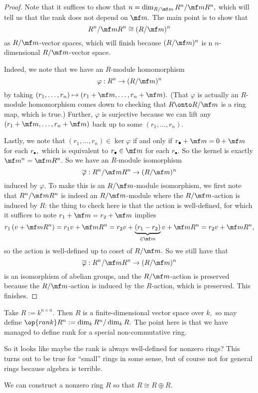 \documentclass[../notes.tex]{subfiles}
\begin{document}
\begin{proof}
	Note that it suffices to show that $n=\dim_{R/\mf m}R^n/\mf mR^n,$ which will tell us that the rank does not depend on $\mf m.$ The main point is to show that
	\[R^n/\mf mR^n\cong(R/\mf m)^n\]
	as $R/\mf m$-vector spaces, which will finish because $(R/\mf m)^n$ is n $n$-dimensional $R/\mf m$-vector space.

	Indeed, we note that we have an $R$-module homomorphism
	\[\varphi:R^n\to(R/\mf m)^n\]
	by taking $(r_1,\ldots,r_n)\mapsto(r_1+\mf m,\ldots,r_n+\mf m).$ (That $\varphi$ is actually an $R$-module homomorphism comes down to checking that $R\onto R/\mf m$ is a ring map, which is true.) Further, $\varphi$ is surjective because we can lift any $(r_1+\mf m,\ldots,r_n+\mf m)$ back up to some $(r_1,\ldots,r_n).$

	Lastly, we note that $(r_1,\ldots,r_n)\in\ker\varphi$ if and only if $r_\bullet+\mf m=0+\mf m$ for each $r_\bullet,$ which is equivalent to $r_\bullet\in\mf m$ for each $r_\bullet.$ So the kernel is exactly $\mf m^n=\mf mR^n.$ So we have an $R$-module isomorphism
	\[\overline\varphi:R^n/\mf mR^n\to(R/\mf m)^n\]
	induced by $\varphi.$ To make this is an $R/\mf m$-module isomorphism, we first note that $R^n/\mf mR^n$ is indeed an $R/\mf m$-module where the $R/\mf m$-action is induced by $R$: the thing to check here is that the action is well-defined, for which it suffices to note $r_1+\mf m=r_2+\mf m$ implies
	\[r_1\left(v+\mf mR^n\right)=r_1v+\mf mR^n=r_2v+\underbrace{(r_1-r_2)}_{\in\mf m}v+\mf mR^n=r_2v+\mf mR^n,\]
	so the action is well-defined up to coset of $R/\mf m.$ So we still have that
	\[\overline\varphi:R^n/\mf mR^n\to(R/\mf m)^n\]
	is an isomorphism of abelian groups, and the $R/\mf m$-action is preserved because the $R/\mf m$-action is induced by the $R$-action, which is preserved. This finishes.
\end{proof}
\begin{example}
	Take $R:=k^{n\times n}.$ Then $R$ is a finite-dimensional vector space over $k,$ so may define $\op{rank}R^n:=\dim_kR^n/\dim_kR.$ The point here is that we have managed to define rank for a special non-commutative ring.
\end{example}
So it looks like maybe the rank is always well-defined for nonzero rings? This turns out to be true for ``small'' rings in some sense, but of course not for general rings because algebra is terrible.
\begin{proposition}
	We can construct a nonzero ring $R$ so that $R\cong R\oplus R.$
\end{proposition}
\end{document}
